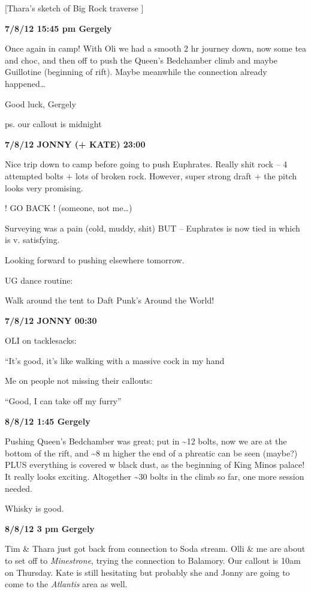 {[}Thara's sketch of Big Rock traverse {]}

\textbf{7/8/12 15:45 pm Gergely}

Once again in camp! With Oli we had a smooth 2 hr journey down, now some
tea and choc, and then off to push the Queen's Bedchamber climb and
maybe Guillotine (beginning of rift). Maybe meanwhile the connection
already happened\ldots{}

Good luck, Gergely

ps. our callout is midnight

\textbf{7/8/12 JONNY (+ KATE) 23:00}

Nice trip down to camp before going to push Euphrates. Really shit rock
-- 4 attempted bolts + lots of broken rock. However, super strong draft
+ the pitch looks very promising.

! GO BACK ! (someone, not me\ldots{})

Surveying was a pain (cold, muddy, shit) BUT -- Euphrates is now tied in
which is v. satisfying.

Looking forward to pushing elsewhere tomorrow.

UG dance routine:

Walk around the tent to Daft Punk's Around the World!

\textbf{7/8/12 JONNY 00:30}

OLI on tacklesacks:

``It's good, it's like walking with a massive cock in my hand

Me on people not missing their callouts:

``Good, I can take off my furry''

\textbf{8/8/12 1:45 Gergely}

Pushing Queen's Bedchamber was great; put in \textasciitilde 12 bolts,
now we are at the bottom of the rift, and \textasciitilde 8 m higher the
end of a phreatic can be seen (maybe?) PLUS everything is covered w
black dust, as the beginning of King Minos palace! It really looks
exciting. Altogether \textasciitilde 30 bolts in the climb so far, one
more session needed.

Whisky is good.

\textbf{8/8/12 3 pm Gergely}

Tim \& Thara just got back from connection to Soda stream. Olli \& me
are about to set off to \emph{Minestrone}, trying the connection to
Balamory. Our callout is 10am on Thursday. Kate is still hesitating but
probably she and Jonny are going to come to the \emph{Atlantis} area as
well.

